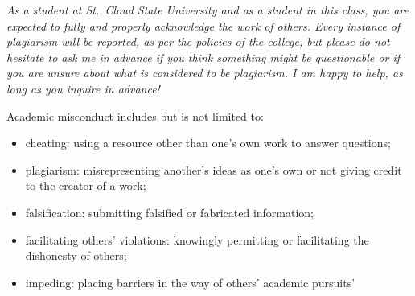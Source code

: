 \documentclass{tufte-handout}
\begin{document}
\begin{fullwidth}
\emph{As a student at St.\ Cloud State University and as a student in this class, you are expected to fully and properly acknowledge the work of others. Every instance of plagiarism will be reported, as per the policies of the college, but please do not hesitate to ask me in advance if you think something might be questionable or if you are unsure about what is considered to be plagiarism. I am happy to help, as long as you inquire in advance! }

Academic misconduct includes but is not limited to:

\begin{itemize}
	\item cheating: using a resource other than one's own work to answer questions;
	\item plagiarism: misrepresenting another's ideas as one's own or not giving credit to the creator of a work;
	\item falsification: submitting falsified or fabricated information;
	\item facilitating others' violations: knowingly permitting or facilitating the dishonesty of others;
	\item impeding: placing barriers in the way of others' academic pursuits'
\end{itemize}




\end{fullwidth}



\end{document}
